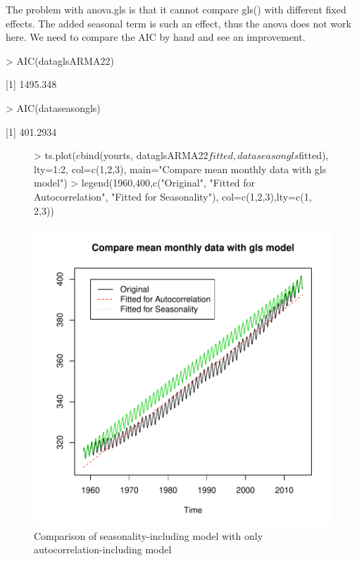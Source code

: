 \documentclass[10pt, a4paper]{article} %
\begin{document}
The problem with anova.gls is that it cannot compare gls() with different fixed effects. The added seasonal term is such an effect, thus the anova does not work here. We need to compare the AIC by hand and see an improvement. 


\begin{Schunk}
\begin{Sinput}
> AIC(dataglsARMA22)
\end{Sinput}
[1] 1495.348\begin{Sinput}
> AIC(dataseasongls)
\end{Sinput}
[1] 401.2934\end{Schunk}

\begin{figure}[H]
\centering
\begin{Schunk}
\begin{Sinput}
> ts.plot(cbind(yourts, dataglsARMA22$fitted,
               dataseasongls$fitted),
         lty=1:2, col=c(1,2,3), 
         main="Compare mean monthly data with gls model")
> legend(1960,400,c("Original",
                   "Fitted for Autocorrelation",
                   "Fitted for Seasonality"),
        col=c(1,2,3),lty=c(1, 2,3))
\end{Sinput}
\end{Schunk}
\includegraphics{FINAL_VERSION-045}
\caption{Comparison of seasonality-including model with only autocorrelation-including model}
\label{compseas2}
\end{figure}
\end{document}
